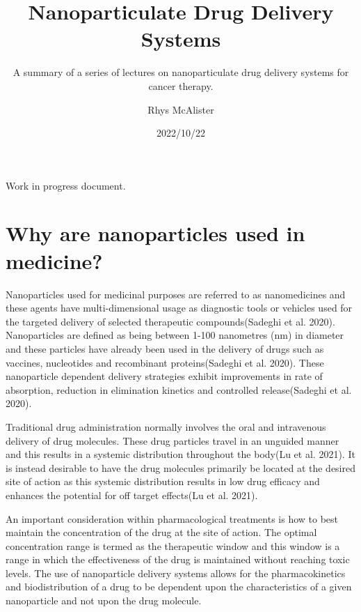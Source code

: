 \documentclass[
  letterpaper,
  DIV=11,
  numbers=noendperiod,
  oneside]{scrartcl}
\title{Nanoparticulate Drug Delivery Systems}
\subtitle{A summary of a series of lectures on nanoparticulate drug
delivery systems for cancer therapy.}
\author{Rhys McAlister}
\date{2022/10/22}
\renewcommand*\contentsname{Table of contents}
\newcommand\contentsname{Table of contents}
\begin{document}
\maketitle
\ifdefined\Shaded\renewenvironment{Shaded}{\begin{tcolorbox}[interior hidden, borderline west={3pt}{0pt}{shadecolor}, sharp corners, enhanced, breakable, frame hidden, boxrule=0pt]}{\end{tcolorbox}}\fi

\renewcommand*\contentsname{Table of contents}
{
\hypersetup{linkcolor=}
\setcounter{tocdepth}{2}
\tableofcontents
}
Work in progress document.

\hypertarget{why-are-nanoparticles-used-in-medicine}{%
\section{Why are nanoparticles used in
medicine?}\label{why-are-nanoparticles-used-in-medicine}}

Nanoparticles used for medicinal purposes are referred to as
nanomedicines and these agents have multi-dimensional usage as
diagnostic tools or vehicles used for the targeted delivery of selected
therapeutic compounds(Sadeghi et al. 2020). Nanoparticles are defined as
being between 1-100 nanometres (nm) in diameter and these particles have
already been used in the delivery of drugs such as vaccines, nucleotides
and recombinant proteins(Sadeghi et al. 2020). These nanoparticle
dependent delivery strategies exhibit improvements in rate of
absorption, reduction in elimination kinetics and controlled
release(Sadeghi et al. 2020).

Traditional drug administration normally involves the oral and
intravenous delivery of drug molecules. These drug particles travel in
an unguided manner and this results in a systemic distribution
throughout the body(Lu et al. 2021). It is instead desirable to have the
drug molecules primarily be located at the desired site of action as
this systemic distribution results in low drug efficacy and enhances the
potential for off target effects(Lu et al. 2021).

An important consideration within pharmacological treatments is how to
best maintain the concentration of the drug at the site of action. The
optimal concentration range is termed as the therapeutic window and this
window is a range in which the effectiveness of the drug is maintained
without reaching toxic levels. The use of nanoparticle delivery systems
allows for the pharmacokinetics and biodistribution of a drug to be
dependent upon the characteristics of a given nanoparticle and not upon
the drug molecule.
\end{document}
